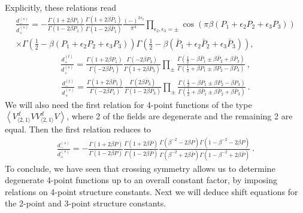 \documentclass[12pt, a4paper]{article}
\theoremstyle{break}
\begin{document}
Explicitly, these relations read 
\begin{multline}
  \frac{d^{(s)}_-}{d^{(s)}_+} = -\frac{\Gamma(1+2\beta P_1)}{\Gamma(1-2\beta P_1)}\frac{\Gamma(1+2\beta\bar P_1)}{\Gamma(1-2\beta\bar P_1)} \frac{(-)^{2s_2}}{\pi^4}
  \prod_{\epsilon_2,\epsilon_3=\pm}
 \cos\left(\pi\beta\left(P_1+\epsilon_2P_2+\epsilon_3 P_3\right)\right)
 \\ \times
 \Gamma\left(\tfrac12 -\beta(P_1+\epsilon_2P_2+\epsilon_3 P_3)\right) \Gamma\left(\tfrac12 -\beta(\bar P_1+\epsilon_2 \bar P_2+\epsilon_3 \bar P_3)\right)  ,
 \label{dmdp}
\end{multline}
\begin{align}
 \frac{d^{(t)}_+}{d^{(s)}_+} = \frac{\Gamma\left(1+2\beta P_1\right)}{\Gamma\left(-2\beta\bar P_1\right)} 
 \frac{\Gamma\left(-2\beta P_3\right)}{\Gamma\left(1+2\beta\bar P_3\right)} 
 \prod_\pm \frac{\Gamma\left(\frac12 -\beta\bar P_1 \pm \beta\bar P_2 +\beta\bar P_3\right)}{\Gamma\left(\frac12+\beta P_1 \pm \beta P_2 -\beta P_3\right)}\ ,
 \label{dpdp}
\end{align}
\begin{align}
 \frac{d^{(t)}_-}{d^{(s)}_+} = \frac{\Gamma\left(1+2\beta \bar P_1\right)}{\Gamma\left(-2\beta P_1\right)} 
 \frac{\Gamma\left(2\beta \bar P_3\right)}{\Gamma\left(1-2\beta P_3\right)} 
 \prod_\pm \frac{\Gamma\left(\frac12 -\beta P_1 \pm \beta P_2 -\beta P_3\right)}{\Gamma\left(\frac12+\beta \bar P_1 \pm \beta \bar P_2 +\beta \bar P_3\right)}\ .
 \label{dtdp}
\end{align}
We will also need the first relation for 4-point functions of the type $\left<V_{\langle 2,1\rangle}^d VV_{\langle 2,1\rangle}^d V\right>$, where 2 of the fields are degenerate and the remaining 2 are equal. Then the first relation reduces to 
\begin{align}
\frac{d^{(s)}_-}{d^{(s)}_+} =
-\frac{\Gamma\left(1+2\beta P\right)}{\Gamma\left(1-2\beta P\right)} \frac{\Gamma\left(1+2\beta \bar P\right)}{\Gamma\left(1-2\beta \bar P\right)} 
 \frac{\Gamma\left(\beta^{-2}-2\beta P\right)\Gamma\left(1-\beta^{-2}-2\beta P\right)}{\Gamma\left(\beta^{-2}+2\beta \bar P\right)\Gamma\left(1-\beta^{-2}+2\beta \bar P\right)}\ .
 \label{ddb}
\end{align}
To conclude, we have seen that crossing symmetry allows us to determine degenerate 4-point functions up to an overall constant factor, by imposing relations on 4-point structure constants. Next we will deduce shift equations for the 2-point and 3-point structure constants. 
\end{document}
